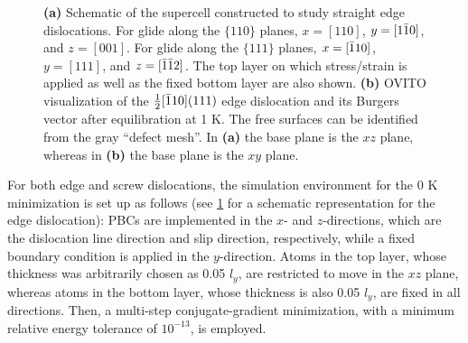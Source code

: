 \documentclass[applsci,article,submit,pdftex,moreauthors]{Definitions/mdpi}
\newcommand{\?}{\stackrel{?}{=}}
\begin{document}

\begin{figure}[h!]
\centering
{}
\hfill
{}

\caption{\textbf{(a)} Schematic of the supercell constructed to study straight edge dislocations. For glide along the $\{ 110 \}$ planes, $x = [110]$, $y = [ 1 \Bar{1} 0 ]$, and $z = [001]$. For glide along the $\{ 111 \}$ planes, $x= [ \Bar{1} 1 0 ]$, $y = [111]$, and $z = [ \Bar{1} \Bar{1} 2 ]$. The top layer on which stress/strain is applied as well as the fixed bottom layer are also shown. \textbf{(b)} OVITO visualization of the $\frac{1}{2} [\Bar{1}10] (111)$ edge dislocation and its Burgers vector after equilibration at 1 K. The free surfaces can be identified from the gray ``defect mesh''. In \textbf{(a)} the base plane is the $xz$ plane, whereas in \textbf{(b)} the base plane is the $xy$ plane.}
\label{Fig:DislocStructure}
\end{figure}

For both edge and screw dislocations, the simulation environment for the 0 K minimization is set up as follows (see \cref{Fig:DislocStructure} for a schematic representation for the edge dislocation): PBCs are implemented in the $x$- and $z$-directions, which are the dislocation line direction and slip direction, respectively, while a fixed boundary condition is applied in the $y$-direction. Atoms in the top layer, whose thickness was arbitrarily chosen as 0.05 $l_y$, are restricted to move in the $xz$ plane, whereas atoms in the bottom layer, whose thickness is also 0.05 $l_y$, are fixed in all directions. Then, a multi-step conjugate-gradient minimization, with a minimum relative energy tolerance of $10^{-13}$, is employed.
\end{document}

